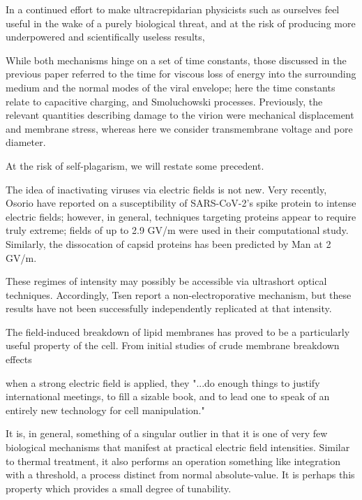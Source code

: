 \documentclass[fleqn,10pt]{paper}
\begin{document}
In a continued effort to make ultracrepidarian physicists such as ourselves feel useful in the wake of a purely biological threat, and at the risk of producing more underpowered and scientifically useless results, 

\begin{tcolorbox}
While both mechanisms hinge on a set of time constants, those discussed in the previous paper referred to the time for viscous loss of energy into the surrounding medium and the normal modes of the viral envelope; here the time constants relate to capacitive charging, and Smoluchowski processes. Previously, the relevant quantities describing damage to the virion were mechanical displacement and membrane stress, whereas here we consider transmembrane voltage and pore diameter. 
\end{tcolorbox}

At the risk of self-plagarism, we will restate some precedent.

The idea of inactivating viruses via electric fields is not new. Very recently, Osorio \cite{Receptor2021} have reported on a susceptibility of SARS-CoV-2's spike protein to intense electric fields; however, in general, techniques targeting proteins appear to require truly extreme; fields of up to 2.9 GV/m were used in their computational study. Similarly, the dissocation of capsid proteins has been predicted by Man \cite{Picosecond2016b} at 2 GV/m.

These regimes of intensity may possibly be accessible via ultrashort optical techniques. Accordingly, Tsen \cite{Studies2014} report a non-electroporative mechanism, but these results have not been successfully independently replicated at that intensity\cite{No2011}. 

The field-induced breakdown of lipid membranes has proved to be a particularly useful property of the cell. From initial studies of crude membrane breakdown effects \cite{Reversible1979}

when a strong electric field is applied, they "...do enough things to justify international meetings, to fill a sizable book, and to lead one to speak of an entirely new technology for cell manipulation."

It is, in general, something of a singular outlier in that it is one of very few biological mechanisms that manifest at practical electric field intensities. Similar to thermal treatment, it also performs an operation something like integration with a threshold, a process distinct from normal absolute-value. It is perhaps this property which provides a small degree of tunability.
\end{document}
